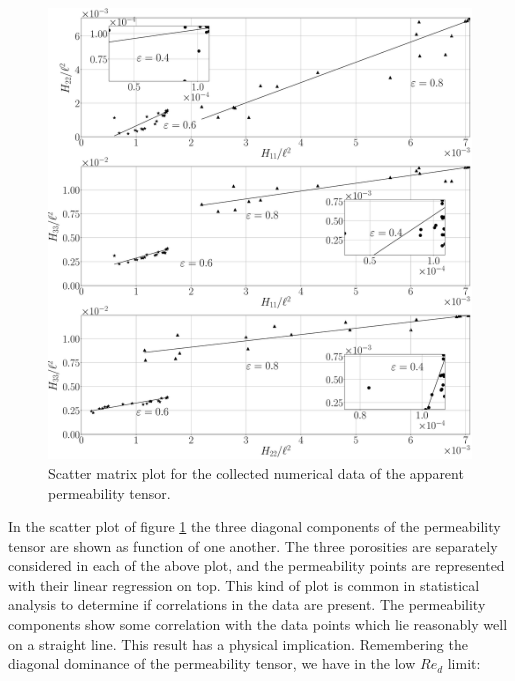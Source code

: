 %



\begin{figure}[H]
	\centering
	\includegraphics[width=1\linewidth]{chapter_4/figure/scatter_matrix}
	\caption{Scatter matrix plot for the collected numerical data of the apparent permeability tensor.}
	\label{fig:scatter_matrix}
\end{figure}



In the scatter plot of figure \ref{fig:scatter_matrix} the three diagonal components of the permeability tensor are shown 
as function of one another. The three porosities are separately considered in each of the above plot, and the permeability points are 
represented with their linear regression on top. This kind of plot is common in statistical analysis to determine if correlations in the data 
are present.  The permeability components show some correlation with the data points which lie reasonably well on a straight line. This
result has a physical implication.
Remembering the diagonal dominance of the permeability tensor, we have in the low
$Re_d$ limit: 

